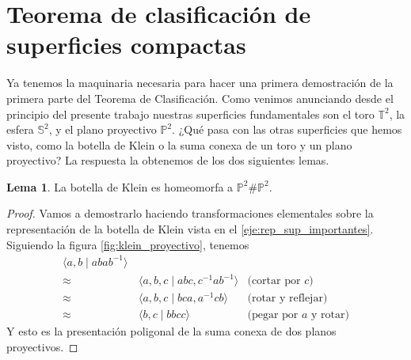 \documentclass[10pt]{report}
\newcommand{\Esfera}{\mathbb{S}^2}
\newcommand{\Toro}{\mathbb{T}^2}
\newcommand{\Proyectivo}{\mathbb{P}^2}
\theoremstyle{definition}
\newtheorem{lema}[defin]{Lema}
\begin{document}
\section{Teorema de clasificación de superficies compactas}

Ya tenemos la maquinaria necesaria para hacer una primera demostración de la primera parte del Teorema de Clasificación.
Como venimos anunciando desde el principio del presente trabajo nuestras superficies fundamentales son el toro $\Toro$, la esfera $ \Esfera$, y el plano proyectivo  $\Proyectivo$. ¿Qué pasa con las otras superficies que hemos visto, como la botella de Klein o la suma conexa de un toro y un plano proyectivo? La respuesta la obtenemos de los dos siguientes lemas.

\begin{lema}\label{lema:klein_proyectivoproyectivo}
La botella de Klein es homeomorfa a $\Proyectivo \# \Proyectivo$.
\end{lema}
\begin{proof}
Vamos a demostrarlo haciendo transformaciones elementales sobre la representación de la botella de Klein vista en el \autoref{eje:rep_sup_importantes}. 
Siguiendo la figura \autoref{fig:klein_proyectivo}, tenemos
\begin{align*}
\langle a,b\mid abab^{-1}\rangle & & \\
\approx & \, \langle a,b,c\mid abc, c^{-1}ab^{-1}\rangle &\text{(cortar por } c\text{)}\\
\approx & \, \langle a,b,c\mid bca,a^{-1}cb\rangle &\text{(rotar y reflejar)}\\
\approx & \, \langle b,c\mid bbcc\rangle &\text{(pegar por } a \text{ y rotar)}
\end{align*}
Y esto es la presentación poligonal de la suma conexa de dos planos proyectivos.
\end{proof}
\end{document}
